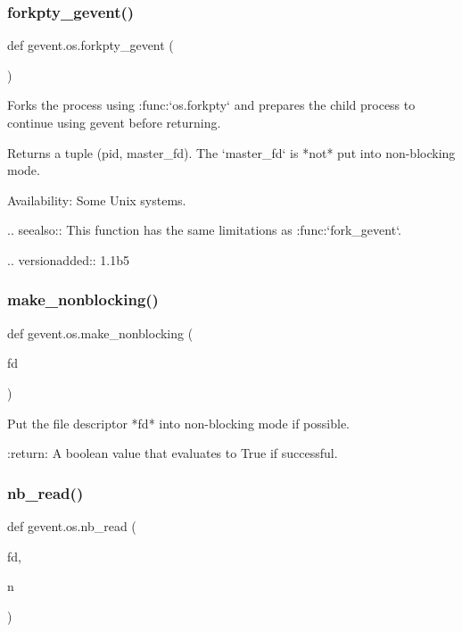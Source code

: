 \subsubsection{\texorpdfstring{forkpty\+\_\+gevent()}{forkpty\_gevent()}}
{\footnotesize\ttfamily def gevent.\+os.\+forkpty\+\_\+gevent (\begin{DoxyParamCaption}{ }\end{DoxyParamCaption})}

\begin{DoxyVerb}Forks the process using :func:`os.forkpty` and prepares the
child process to continue using gevent before returning.

Returns a tuple (pid, master_fd). The `master_fd` is *not* put into
non-blocking mode.

Availability: Some Unix systems.

.. seealso:: This function has the same limitations as :func:`fork_gevent`.

.. versionadded:: 1.1b5
\end{DoxyVerb}
 \mbox{\label{namespacegevent_1_1os_afda17326a86efe283deb154009b8aac9}} 
\subsubsection{\texorpdfstring{make\+\_\+nonblocking()}{make\_nonblocking()}}
{\footnotesize\ttfamily def gevent.\+os.\+make\+\_\+nonblocking (\begin{DoxyParamCaption}\item[{}]{fd }\end{DoxyParamCaption})}

\begin{DoxyVerb}Put the file descriptor *fd* into non-blocking mode if
possible.

:return: A boolean value that evaluates to True if successful.
\end{DoxyVerb}
 \mbox{\label{namespacegevent_1_1os_a2fb3b6b13b3e790a9a392746bd295ffb}} 
\subsubsection{\texorpdfstring{nb\+\_\+read()}{nb\_read()}}
{\footnotesize\ttfamily def gevent.\+os.\+nb\+\_\+read (\begin{DoxyParamCaption}\item[{}]{fd,  }\item[{}]{n }\end{DoxyParamCaption})}

